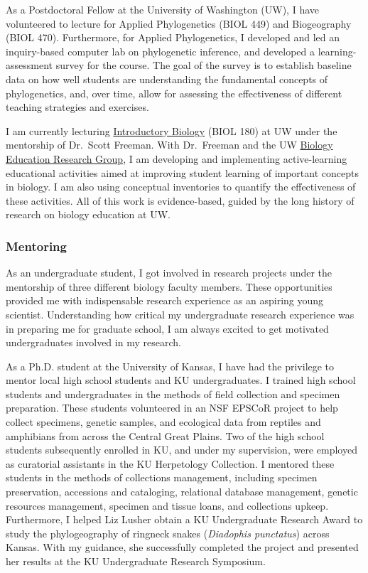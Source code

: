 As a Postdoctoral Fellow at the University of Washington (UW), I have
volunteered to lecture for Applied Phylogenetics (BIOL 449) and Biogeography
(BIOL 470).
Furthermore, for Applied Phylogenetics, I developed and led an inquiry-based
computer lab on phylogenetic inference, and developed a learning-assessment
survey for the course.
The goal of the survey is to establish baseline data on how well students are
understanding the fundamental concepts of phylogenetics, and, over time, allow
for assessing the effectiveness of different teaching strategies and exercises.

I am currently lecturing
\href{http://courses.biology.washington.edu/biol180/}{Introductory Biology}
(BIOL 180) at UW under the mentorship of Dr.\ Scott Freeman.
With Dr.\ Freeman and the UW \href{http://uw-berg.wikifoundry.com/}{Biology
    Education Research Group}, I am developing and implementing active-learning
educational activities aimed at improving student learning of important
concepts in biology.
I am also using conceptual inventories to quantify the effectiveness of these
activities.
All of this work is evidence-based, guided by the long history of research on
biology education at UW.

\subsubsection*{Mentoring}
As an undergraduate student, I got involved in research projects under the
mentorship of three different biology faculty members.
These opportunities provided me with indispensable research experience as an
aspiring young scientist.
Understanding how critical my undergraduate research experience was in
preparing me for graduate school, I am always excited to get motivated
undergraduates involved in my research.

As a Ph.D. student at the University of Kansas, I have had the privilege to
mentor local high school students and KU undergraduates.
I trained high school students and undergraduates in the methods of field
collection and specimen preparation.
These students volunteered in an NSF EPSCoR project to help collect specimens,
genetic samples, and ecological data from reptiles and amphibians from across
the Central Great Plains.
Two of the high school students subsequently enrolled in KU, and under my
supervision, were employed as curatorial assistants in the KU Herpetology
Collection.
I mentored these students in the methods of collections management, including
specimen preservation, accessions and cataloging, relational database
management, genetic resources management, specimen and tissue loans, and
collections upkeep.
Furthermore, I helped Liz Lusher obtain a KU Undergraduate Research Award to
study the phylogeography of ringneck snakes (\emph{Diadophis punctatus}) across
Kansas.
With my guidance, she successfully completed the project and presented her
results at the KU Undergraduate Research Symposium.

